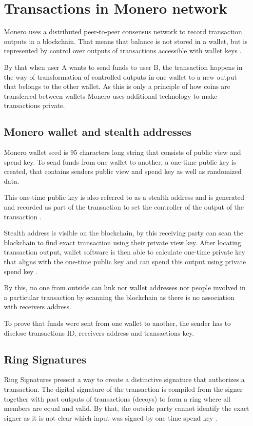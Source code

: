 \documentclass[
  printed, %
  table,   %
  lof,     %
  lot,     %
           oneside, color
]{fithesis3}
\begin{document}
\section{Transactions in Monero network}
Monero uses a distributed peer-to-peer consensus network to record transaction outputs in a blockchain. That means that balance is not stored in a wallet, but is represented by control over outputs of transactions accessible with wallet keys \cite{seguias2018moneroa}.

By that when user A wants to send funds to user B, the transaction happens in the way of transformation of controlled outputs in one wallet to a new output that belongs to the other wallet. As this is only a principle of how coins are transferred between wallets Monero uses additional technology to make transactions private.
\subsection{Monero wallet and stealth addresses}
\label{sec:stealthaddresses}
Monero wallet seed is 95 characters long string that consists of public view and spend key. To send funds from one wallet to another, a one-time public key is created, that contains senders public view and spend key as well as randomized data. 

This one-time public key is also referred to as a stealth address and is generated and recorded as part of the transaction to set the controller of the output of the transaction \cite{seguias2018monero}.

Stealth address is visible on the blockchain, by this receiving party can scan the blockchain to find exact transaction using their private view key. After locating transaction output, wallet software is then able to calculate one-time private key that aligns with the one-time public key and can spend this output using private spend key \cite{courtois2017stealth}.

By this, no one from outside can link nor wallet addresses nor people involved in a particular transaction by scanning the blockchain as there is no association with receivers address.

To prove that funds were sent from one wallet to another, the sender has to disclose transactions ID, receivers address and transactions key.

\subsection{Ring Signatures}
\label{sec:ringsignatures}
Ring Signatures present a way to create a distinctive signature that authorizes a transaction. The digital signature of the transaction is compiled from the signer together with past outputs of transactions (decoys) to form a ring where all members are equal and valid. By that, the outside party cannot identify the exact signer as it is not clear which input was signed by one time spend key \cite{mercer2016privacy}.
\end{document}
